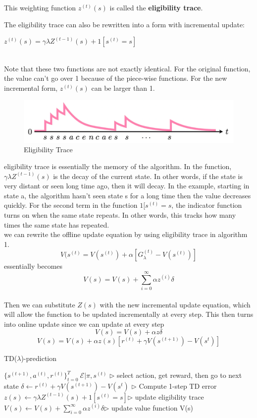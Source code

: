 \documentclass[11pt]{article}
\begin{document}
This weighting function $z^{(t)}(s)$ is called the \textbf{eligibility trace}.

The eligibility trace can also be rewritten into a form with incremental update:\\
\begin{large}
    $ z^{(t)}(s) = \gamma \lambda Z^(t-1)(s) + 1[s^(t) = s]$
\end{large} \\

Note that these two functions are not exactly identical. For the original function, the value can't go over 1 because of the piece-wise functions. For the new incremental form, $z^(t)(s)$ can be larger than 1.
\begin{figure}[H]
    \centering
    \includegraphics[width=0.5\linewidth]{images/Eligibility Trace.png}
    \caption{Eligibility Trace}
    \label{fig:lambda-return_params}
\end{figure}

eligibility trace is essentially the memory of the algorithm. In the function, $\gamma \lambda Z^{(t-1)}(s)$ is the decay of the current state. In other words, if the state is very distant or seen long time ago, then it will decay. In the example, starting in state a, the algorithm hasn't seen state s for a long time then the value decreases quickly. For the second term in the function $1[s^{(t)} = s$, the indicator function turns on when the same state repeats. In other words, this tracks how many times the same state has repeated. 
\\
we can rewrite the offline update equation by using eligibility trace in algorithm 1.
$$V(s^({t}) = V(s^{(t)}) + \alpha [G_{\lambda}^{(t)} - V(s^{(t)})]$$ essentially becomes $$V(s) = V(s) + \sum_{i=0}^\infty \alpha z^{(i)} \delta$$ \\
Then we can substitute $Z(s)$ with the new incremental update equation, which will allow the function to be updated incrementally at every step. This then turns into online update since we can update at every step $$V(s) = V(s) + \alpha z \delta$$
$$V(s) = V(s) + \alpha z(s) [r^(t) + \gamma V(s^{(t+1)}) - V(s^t)]$$
\begin{algorithm}[H]
\caption{TD($\lambda$)-prediction}
\label{algo:TDP}
\begin{algorithmic}[1]
\STATE $\{s^{(t+1)}, a^{(t)}, r^{(t)}\}_{t=0}^T ~ \mathcal{E}|\pi,s^{(t)}$ \hfill $\triangleright$ select action, get reward, then go to next state
\STATE $\delta \xleftarrow{} r^(t) + \gamma V(s^{(t+1)}) - V(s^t)$ \hfill $\triangleright$ Compute 1-step TD error
\STATE $ z(s) \xleftarrow{} \gamma \lambda Z^(t-1)(s) + 1[s^(t) = s]$\hfill $\triangleright$ update eligibility trace
\STATE $V(s) \xleftarrow{} V(s) + \sum_{i=0}^\infty \alpha z^{(i)} \delta$\hfill $\triangleright$ update value function
\ENDFOR
\ENDFOR
\RETURN V(s)
\end{algorithmic}
\end{algorithm}
\end{document}

